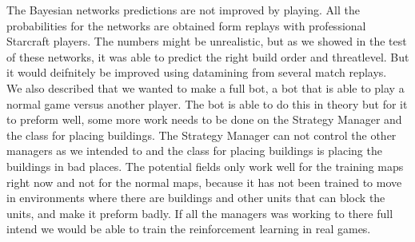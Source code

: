 The Bayesian networks predictions are not improved by playing. All the probabilities for the networks are obtained form replays with professional Starcraft players. The numbers might be unrealistic, but as we showed in the test of these networks, it was able to predict the right build order and threatlevel. But it would deifnitely be improved using datamining from several match replays. \\

We also described that we wanted to make a full bot, a bot that is able to play a normal game versus another player. The bot is able to do this in theory but for it to preform well, some more work needs to be done on the Strategy Manager and the class for placing buildings. The Strategy Manager can not control the other managers as we intended to and the class for placing buildings is placing the buildings in bad places. The potential fields only work well for the training maps right now and not for the normal maps, because it has not been trained to move in environments where there are buildings and other units that can block the units, and make it preform badly. If all the managers was working to there full intend we would be able to train the reinforcement learning in real games.
